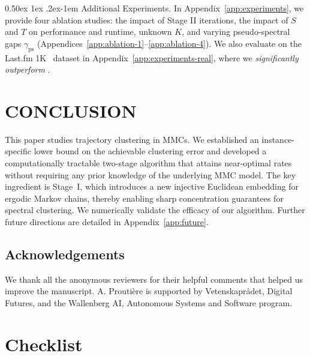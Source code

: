 \documentclass[twoside]{article}
\makeatletter
\renewcommand{\paragraph}{%
  \@startsection{paragraph}{4}%
  {\z@}{0.50ex \@plus 1ex \@minus .2ex}{-1em}%
  {\normalfont\normalsize\bfseries}%
}
\theoremstyle{plain}
\newcommand{\ps}{\mathrm{ps}}
\makeatother
\begin{document}
\paragraph{Additional Experiments.}
In Appendix~\ref{app:experiments}, we provide four ablation studies: the impact of Stage II iterations, the impact of $S$ and $T$ on performance and runtime, unknown $K$, and varying pseudo-spectral gaps $\gamma_\ps$ (Appendices~\ref{app:ablation-1}--\ref{app:ablation-4}).
We also evaluate on the Last.fm 1K~\citep{lastfm1k} dataset in Appendix~\ref{app:experiments-real}, where we \emph{significantly outperform} \citet{kausik2023mixture}.




\section{CONCLUSION}
\label{sec:conclusion}
This paper studies trajectory clustering in MMCs.
We established an instance-specific lower bound on the achievable clustering error and developed a computationally tractable two-stage algorithm that attains near-optimal rates without requiring any prior knowledge of the underlying MMC model.
The key ingredient is Stage~I, which introduces a new injective Euclidean embedding for ergodic Markov chains, thereby enabling sharp concentration guarantees for spectral clustering.
We numerically validate the efficacy of our algorithm.
Further future directions are detailed in Appendix~\ref{app:future}.



\newpage

\subsection*{Acknowledgements}
We thank all the anonymous reviewers for their helpful comments that helped us improve the manuscript.
A. Prouti\`{e}re is supported by Vetenskapr{\aa}det, Digital Futures, and the Wallenberg AI, Autonomous Systems and Software program.





\clearpage
\section*{Checklist}
\end{document}

